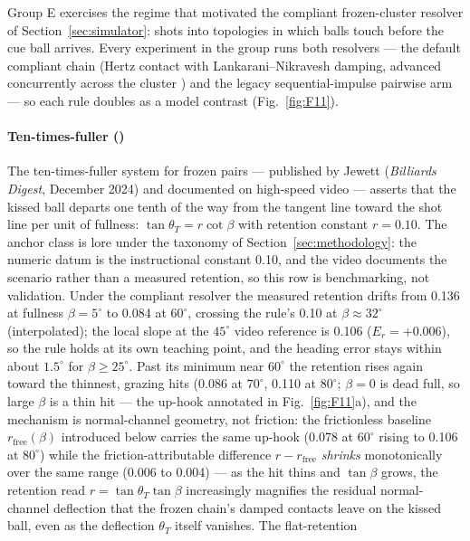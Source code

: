 Group E exercises the regime that motivated the compliant frozen-cluster
resolver of Section~\ref{sec:simulator}: shots into topologies in which
balls touch before the cue ball arrives. Every experiment in the group
runs both resolvers --- the default compliant chain (Hertz contact with
Lankarani--Nikravesh damping, advanced concurrently across the cluster
\citep{lankarani1994continuous}) and the legacy sequential-impulse
pairwise arm --- so each rule doubles as a model contrast
(Fig.~\ref{fig:F11}).

\paragraph{Ten-times-fuller ()}
The ten-times-fuller system for frozen pairs --- published by Jewett
(\emph{Billiards Digest}, December 2024) and documented on high-speed
video \citep{alciatore_hsv_catalog} --- asserts that the kissed ball
departs one tenth of the way from the tangent line toward the shot line
per unit of fullness: $\tan\theta_T = r\cot\beta$ with retention constant
$r = 0.10$. The anchor class is lore under the taxonomy of
Section~\ref{sec:methodology}: the numeric datum is the instructional
constant 0.10, and the video documents the scenario rather than a
measured retention, so this row is benchmarking, not validation. Under the compliant resolver the measured retention drifts
from 0.136 at fullness $\beta = 5^\circ$ to 0.084 at $60^\circ$, crossing
the rule's 0.10 at $\beta \approx 32^\circ$ (interpolated); the local
slope at the
$45^\circ$ video reference is 0.106 ($E_r = +0.006$), so the rule
holds at its own teaching point, and the heading error stays within
about $1.5^\circ$ for $\beta \geq 25^\circ$. Past its minimum near
$60^\circ$ the retention rises again toward the thinnest, grazing hits
(0.086 at
$70^\circ$, 0.110 at $80^\circ$; $\beta = 0$ is dead full, so large
$\beta$ is a thin hit --- the up-hook annotated in
Fig.~\ref{fig:F11}a), and the mechanism is normal-channel geometry, not
friction: the frictionless baseline $r_{\mathrm{free}}(\beta)$
introduced below carries the same up-hook (0.078 at $60^\circ$ rising
to 0.106 at $80^\circ$) while the friction-attributable difference
$r - r_{\mathrm{free}}$ \emph{shrinks} monotonically over the same
range (0.006 to 0.004) --- as the hit thins and $\tan\beta$ grows, the
retention read
$r = \tan\theta_T \tan\beta$ increasingly magnifies the residual
normal-channel deflection that the frozen chain's damped contacts leave
on the kissed ball, even as the deflection $\theta_T$ itself vanishes. The flat-retention
